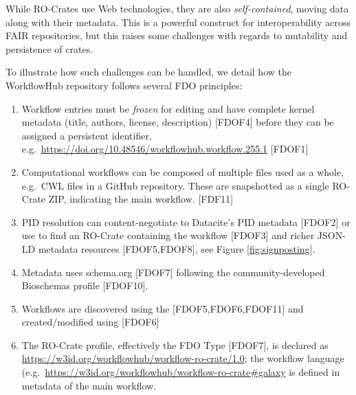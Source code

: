 While RO-Crates use Web technologies, they are also
\emph{self-contained}, moving data along with their metadata. This is a
powerful construct for interoperability across FAIR repositories, but
this raises some challenges with regards to mutability and persistence
of crates.

To illustrate how such challenges can be handled, we detail how the
WorkflowHub repository follows several FDO principles:

\begin{enumerate}

\item
  Workflow entries must be \emph{frozen} for editing and have complete
  kernel metadata (title, authors, license, description) {[}FDOF4{]}
  before they can be assigned a persistent identifier,
  e.g.~\url{https://doi.org/10.48546/workflowhub.workflow.255.1}
  {[}FDOF1{]}
\item
  Computational workflows can be composed of multiple files used as a
  whole, e.g.~CWL files in a GitHub repository. These are snapshotted as
  a single RO-Crate ZIP, indicating the main workflow. {[}FDF11{]}
\item
  PID resolution can content-negotiate to Datacite's PID metadata
  {[}FDOF2{]} or use  to find an RO-Crate containing the workflow {[}FDOF3{]}
  and richer JSON-LD metadata resources {[}FDOF5,FDOF8{]}, see
  Figure \vref{fig:signposting}.
\item
  Metadata uses schema.org {[}FDOF7{]} following the community-developed
  Bioschemas
  profile {[}FDOF10{]}.
\item
  Workflows are discovered using
  the
  {[}FDOF5,FDOF6,FDOF11{]} and created/modified using
   {[}FDOF6{]}
\item
  The RO-Crate profile, effectively the FDO Type {[}FDOF7{]}, is
  declared as \url{https://w3id.org/workflowhub/workflow-ro-crate/1.0};
  the workflow language
  (e.g.~\url{https://w3id.org/workflowhub/workflow-ro-crate\#galaxy} is
  defined in metadata of the main workflow.
\end{enumerate}



